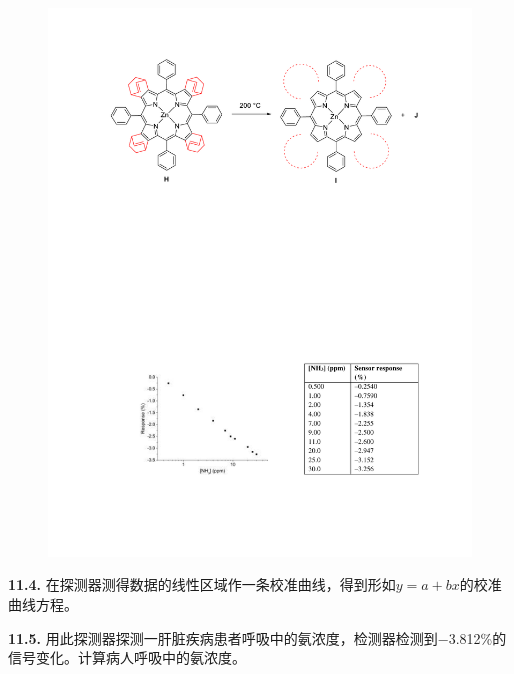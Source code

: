 \begin{figure}[h]
	\centering
	\includegraphics[width=14cm]{./pic/t11-4.pdf}
\end{figure}

\noindent\textbf{11.4.} 在探测器测得数据的线性区域作一条校准曲线，得到形如$y=a+bx$的校准曲线方程。

\noindent\textbf{11.5.}
用此探测器探测一肝脏疾病患者呼吸中的氨浓度，检测器检测到−3.812\%的信号变化。计算病人呼吸中的氨浓度。
